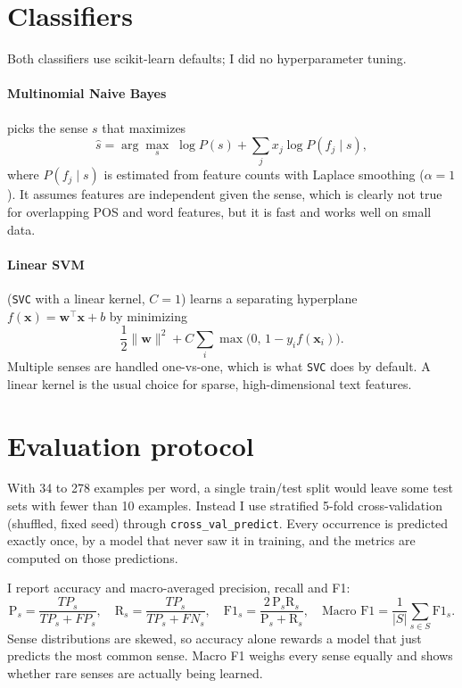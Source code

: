 \documentclass[11pt]{article}
\begin{document}
\section{Classifiers}

Both classifiers use scikit-learn defaults; I did no hyperparameter tuning.

\paragraph{Multinomial Naive Bayes} picks the sense $s$ that maximizes
\[
\hat{s} = \arg\max_s \; \log P(s) + \sum_j x_j \log P(f_j \mid s),
\]
where $P(f_j \mid s)$ is estimated from feature counts with Laplace smoothing
($\alpha = 1$). It assumes features are independent given the sense, which is
clearly not true for overlapping POS and word features, but it is fast and works
well on small data.

\paragraph{Linear SVM} (\texttt{SVC} with a linear kernel, $C = 1$) learns a
separating hyperplane $f(\mathbf{x}) = \mathbf{w}^\top \mathbf{x} + b$ by
minimizing
\[
\frac{1}{2}\lVert \mathbf{w} \rVert^2 + C \sum_i
\max\big(0,\, 1 - y_i f(\mathbf{x}_i)\big).
\]
Multiple senses are handled one-vs-one, which is what \texttt{SVC} does by
default. A linear kernel is the usual choice for sparse, high-dimensional text
features.

\section{Evaluation protocol}

With 34 to 278 examples per word, a single train/test split would leave some
test sets with fewer than 10 examples. Instead I use stratified 5-fold
cross-validation (shuffled, fixed seed) through \texttt{cross\_val\_predict}.
Every occurrence is predicted exactly once, by a model that never saw it in
training, and the metrics are computed on those predictions.

I report accuracy and macro-averaged precision, recall and F1:
\[
\mathrm{P}_s = \frac{TP_s}{TP_s + FP_s}, \quad
\mathrm{R}_s = \frac{TP_s}{TP_s + FN_s}, \quad
\mathrm{F1}_s =
\frac{2\,\mathrm{P}_s \mathrm{R}_s}{\mathrm{P}_s + \mathrm{R}_s},
\quad
\text{Macro F1} = \frac{1}{|S|} \sum_{s \in S} \mathrm{F1}_s.
\]
Sense distributions are skewed, so accuracy alone rewards a model that just
predicts the most common sense. Macro F1 weighs every sense equally and shows
whether rare senses are actually being learned.
\end{document}
